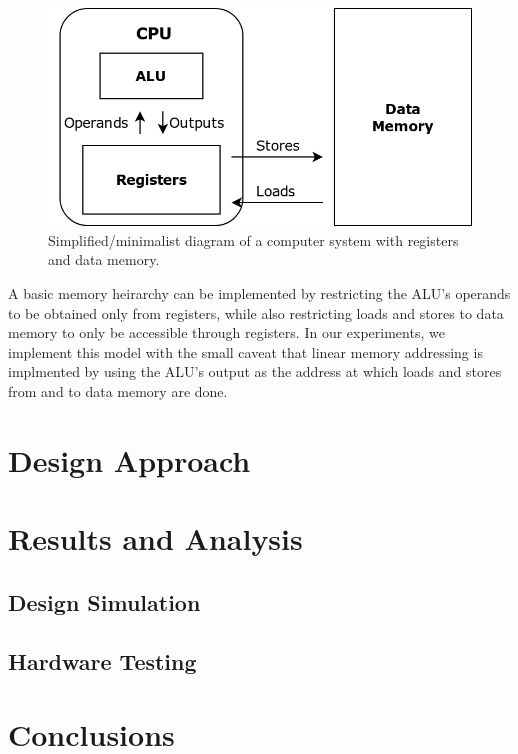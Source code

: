 \documentclass[12pt, letterpaper]{article}
\begin{document}
\begin{figure}[h]
\centering
\includegraphics[width=.7\linewidth]{images/simple-stateful-cpu.png}
\caption{Simplified/minimalist diagram of a computer system with registers and data memory.}
\end{figure}

A basic memory heirarchy can be implemented by restricting the ALU's operands to be obtained only from registers, while also restricting loads and stores to data memory to only be accessible through registers.  In our experiments, we implement this model with the small caveat that linear memory addressing is implmented by using the ALU's output as the address at which loads and stores from and to data memory are done.



\newpage
\section{Design Approach}




\newpage
\section{Results and Analysis}

\subsection{Design Simulation}

\subsection{Hardware Testing}




\newpage
\section{Conclusions}
\end{document}
